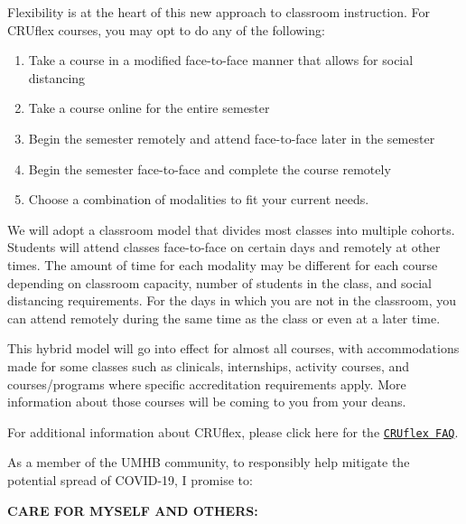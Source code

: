 \documentclass[
]{article}
\begin{document}
Flexibility is at the heart of this new approach to classroom
instruction. For CRUflex courses, you may opt to do any of the
following:

\begin{enumerate} 
\item Take a course in a modified face-to-face manner that allows for social distancing
\item Take a course online for the entire semester 
\item Begin the semester remotely and attend face-to-face later in the semester
\item Begin the semester face-to-face and complete the course remotely
\item Choose a combination of modalities to fit your current needs.
\end{enumerate}

We will adopt a classroom model that divides most classes into multiple
cohorts. Students will attend classes face-to-face on certain days and
remotely at other times. The amount of time for each modality may be
different for each course depending on classroom capacity, number of
students in the class, and social distancing requirements. For the days
in which you are not in the classroom, you can attend remotely during
the same time as the class or even at a later time.

This hybrid model will go into effect for almost all courses, with
accommodations made for some classes such as clinicals, internships,
activity courses, and courses/programs where specific accreditation
requirements apply. More information about those courses will be coming
to you from your deans.

For additional information about CRUflex, please click here for the
\texttt{\href{https://bit.ly/3fJpoEW}{CRUflex FAQ}}.

\newpage

\begin{center}
\end{center}

\vspace{.25cm}

As a member of the UMHB community, to responsibly help mitigate the
potential spread of COVID-19, I promise to:

\textbf{CARE FOR MYSELF AND OTHERS:}
\end{document}
